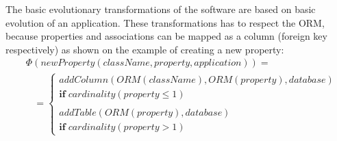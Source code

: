 \documentclass[runningheads]{comsis}
\begin{document}
The basic evolutionary transformations of the software are based on basic evolution of an application. These transformations has to respect the ORM, because properties and associations can be mapped as a column (foreign key respectively) as shown on the example of creating a new property: 
\begin{align}
& \Phi(newProperty(className, property, application)) = \nonumber \\
& \;\;\; =  \begin{cases}
  addColumn(ORM(className), ORM(property), database) \\\mathbf{if} \; cardinality(property \leq 1)  \\\\
  addTable(ORM(property), database) \\
  \mathbf{if} \; cardinality(property > 1)  
   \end{cases}
\end{align}
\end{document}
